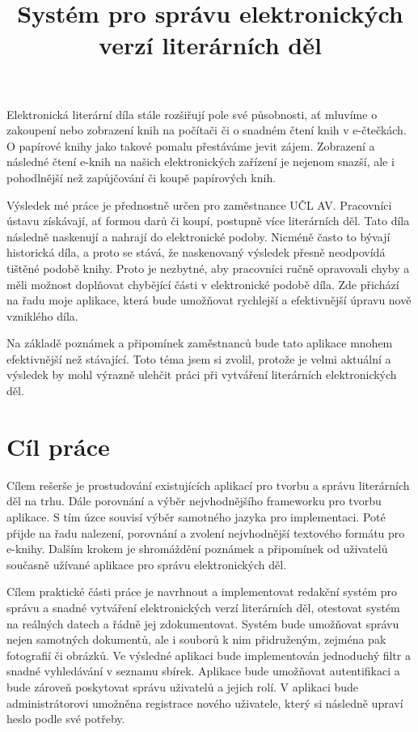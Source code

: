 \documentclass[thesis=B,czech]{FITthesis}[2012/06/26]
\title{Systém pro správu elektronických verzí literárních děl}
\begin{document}

\begin{introduction}

    Elektronická literární díla stále rozšiřují pole své působnosti, ať mluvíme o zakoupení nebo zobrazení knih na počítači či o snadném čtení knih v e-čtečkách. O papírové knihy jako takové pomalu přestáváme jevit zájem. Zobrazení a následné čtení e-knih na našich elektronických zařízení je nejenom snazší, ale i pohodlnější než zapůjčování či koupě papírových knih.

	Výsledek mé práce je přednostně určen pro zaměstnance UČL AV. Pracovníci ústavu získávají, ať formou darů či koupí, postupně více literárních děl. Tato díla následně naskenují a nahrají do elektronické podoby. Nicméně často to bývají historická díla, a proto se stává, že naskenovaný výsledek přesně neodpovídá tištěné podobě knihy. Proto je nezbytné, aby pracovníci ručně opravovali chyby a měli možnost doplňovat chybějící části v elektronické podobě díla. Zde přichází na řadu moje aplikace, která bude umožňovat rychlejší a efektivnější úpravu nově vzniklého díla.

	Na základě poznámek a připomínek zaměstnanců bude tato aplikace mnohem efektivnější než stávající. Toto téma jsem si zvolil, protože je velmi aktuální a výsledek by mohl výrazně ulehčit práci při vytváření literárních elektronických děl.

\end{introduction}

\chapter{Cíl práce}
    Cílem rešerše je prostudování existujících aplikací pro tvorbu a správu literárních děl na trhu. Dále porovnání a výběr nejvhodnějšího frameworku pro tvorbu aplikace. S tím úzce souvisí výběr samotného jazyka pro implementaci. Poté přijde na řadu nalezení, porovnání a zvolení nejvhodnější textového formátu pro e-knihy. Dalším krokem je shromáždění poznámek a připomínek od uživatelů současně užívané aplikace pro správu elektronických děl.
    
    Cílem praktické části práce je navrhnout a implementovat redakční systém pro správu a snadné vytváření elektronických verzí literárních děl, otestovat systém na reálných datech a řádně jej zdokumentovat. Systém bude umožňovat správu nejen samotných dokumentů, ale i souborů k nim přidruženým, zejména pak fotografií či obrázků. Ve výsledné aplikaci bude implementován jednoduchý filtr a snadné vyhledávání v seznamu sbírek. Aplikace bude umožňovat autentifikaci a bude zároveň poskytovat správu uživatelů a jejich rolí. V aplikaci bude administrátorovi umožněna registrace nového uživatele, který si následně upraví heslo podle své potřeby.
\end{document}
